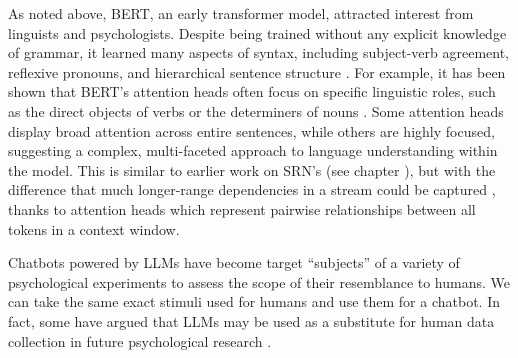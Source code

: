 As noted above, BERT, an early transformer model, attracted interest from
linguists and psychologists. Despite being trained without any explicit
knowledge of grammar, it learned many aspects of syntax, including subject-verb
agreement, reflexive pronouns, and hierarchical sentence structure
\cite{goldberg2019assessing, linzen2021syntactic, tenney2019bert}. For example,
it has been shown that BERT's attention heads often focus on specific
linguistic roles, such as the direct objects of verbs or the determiners of
nouns \cite{clark2019does}. Some attention heads display broad attention across
entire sentences, while others are highly focused, suggesting a complex,
multi-faceted approach to language understanding within the model. This is
similar to earlier work on SRN's (see chapter
), but with the difference that much
longer-range dependencies in a stream could be captured
\cite{mcclelland2020placing}, thanks to attention heads which represent
pairwise relationships between all tokens in a context window. 

Chatbots powered by LLMs have become target ``subjects'' of a variety of
psychological experiments to assess the scope of their resemblance to humans.
We can take the same exact stimuli used for humans and use them for a chatbot.
In fact, some have argued that LLMs may be used as a substitute for human data
collection in future psychological research \cite{aher2023using,
dillion2023can}.


